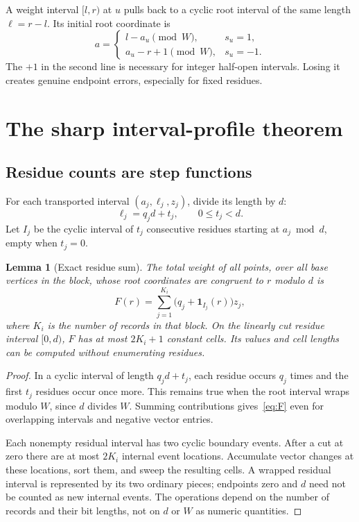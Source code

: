 \documentclass[11pt]{article}
\newtheorem{lemma}[theorem]{Lemma}
\theoremstyle{definition}
\newcommand{\ind}{\mathbf 1}
\begin{document}
A weight interval $[l,r)$ at $u$ pulls back to a cyclic root interval of the same length $\ell=r-l$. Its initial root coordinate is
\begin{equation}
 a=\begin{cases}
 l-a_u \pmod W,&s_u=1,\\
 a_u-r+1\pmod W,&s_u=-1.
 \end{cases}
 \label{eq:pullinterval}
\end{equation}
The $+1$ in the second line is necessary for integer half-open intervals. Losing it creates genuine endpoint errors, especially for fixed residues.

\section{The sharp interval-profile theorem}
\label{sec:profiles}

\subsection{Residue counts are step functions}
For each transported interval $(a_j,\ell_j,z_j)$, divide its length by $d$:
\[
 \ell_j=q_jd+t_j,\qquad 0\le t_j<d.
\]
Let $I_j$ be the cyclic interval of $t_j$ consecutive residues starting at $a_j\bmod d$, empty when $t_j=0$.

\begin{lemma}[Exact residue sum]
\label{lem:residue}
The total weight of all points, over all base vertices in the block, whose root coordinates are congruent to $r$ modulo $d$ is
\begin{equation}
 F(r)=\sum_{j=1}^{K_i}\bigl(q_j+\ind_{I_j}(r)\bigr)z_j,
 \label{eq:F}
\end{equation}
where $K_i$ is the number of records in that block. On the linearly cut residue interval $[0,d)$, $F$ has at most $2K_i+1$ constant cells. Its values and cell lengths can be computed without enumerating residues.
\end{lemma}
\begin{proof}
In a cyclic interval of length $q_jd+t_j$, each residue occurs $q_j$ times and the first $t_j$ residues occur once more. This remains true when the root interval wraps modulo $W$, since $d$ divides $W$. Summing contributions gives~\eqref{eq:F} even for overlapping intervals and negative vector entries.

Each nonempty residual interval has two cyclic boundary events. After a cut at zero there are at most $2K_i$ internal event locations. Accumulate vector changes at these locations, sort them, and sweep the resulting cells. A wrapped residual interval is represented by its two ordinary pieces; endpoints zero and $d$ need not be counted as new internal events. The operations depend on the number of records and their bit lengths, not on $d$ or $W$ as numeric quantities.
\end{proof}
\end{document}
